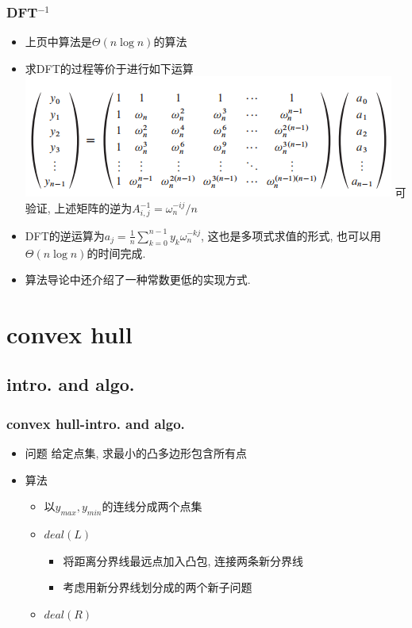 \documentclass[cjk]{beamer}
\begin{document}
\begin{CJK*}{UTF8}{gbsn}
    \begin{frame}
      \frametitle{DFT$^{-1}$}
      \begin{itemize}
        \item 上页中算法是$\Theta(n\log n)$的算法
        \item 求DFT的过程等价于进行如下运算
          \newline
          \includegraphics[scale = 0.6]{2.png}
          \newline
          可验证, 上述矩阵的逆为$A^{-1}_{i, j} = {\omega_n^{-ij} / n}$
        \item DFT的逆运算为$a_j = \frac{1}{n}\sum\limits_{k = 0}^{n - 1}y_k\omega_n^{-kj}$, 这也是多项式求值的形式, 也可以用$\Theta(n\log n)$的时间完成.
        \item 算法导论中还介绍了一种常数更低的实现方式.
      \end{itemize}
    \end{frame}

\section{convex hull}
  \subsection{intro. and algo.}
    \begin{frame}
      \frametitle{convex hull-intro. and algo.}
      \begin{itemize}
        \item 问题 给定点集, 求最小的凸多边形包含所有点
        \pause \item 算法
          \begin{itemize}
            \item 以$y_{max}, y_{min}$的连线分成两个点集
            \item $deal(L)$
              \begin{itemize}
                \item 将距离分界线最远点加入凸包, 连接两条新分界线
                \item 考虑用新分界线划分成的两个新子问题
              \end{itemize}
            \item $deal(R)$
          \end{itemize}
      \end{itemize}
    \end{frame}


\end{CJK*}
\end{document}
